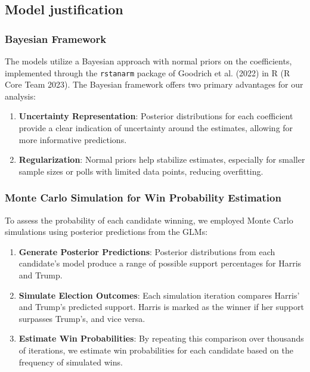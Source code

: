 \documentclass[
  letterpaper,
  DIV=11,
  numbers=noendperiod]{scrartcl}
\begin{document}
\subsection{Model justification}\label{model-justification}

\subsubsection{Bayesian Framework}\label{bayesian-framework}

The models utilize a Bayesian approach with normal priors on the
coefficients, implemented through the \texttt{rstanarm} package of
Goodrich et al. (2022) in R (R Core Team 2023). The Bayesian framework
offers two primary advantages for our analysis:

\begin{enumerate}
\def\labelenumi{\arabic{enumi}.}
\item
  \textbf{Uncertainty Representation}: Posterior distributions for each
  coefficient provide a clear indication of uncertainty around the
  estimates, allowing for more informative predictions.
\item
  \textbf{Regularization}: Normal priors help stabilize estimates,
  especially for smaller sample sizes or polls with limited data points,
  reducing overfitting.
\end{enumerate}

\subsubsection{Monte Carlo Simulation for Win Probability
Estimation}\label{monte-carlo-simulation-for-win-probability-estimation}

To assess the probability of each candidate winning, we employed Monte
Carlo simulations using posterior predictions from the GLMs:

\begin{enumerate}
\def\labelenumi{\arabic{enumi}.}
\item
  \textbf{Generate Posterior Predictions}: Posterior distributions from
  each candidate's model produce a range of possible support percentages
  for Harris and Trump.
\item
  \textbf{Simulate Election Outcomes}: Each simulation iteration
  compares Harris' and Trump's predicted support. Harris is marked as
  the winner if her support surpasses Trump's, and vice versa.
\item
  \textbf{Estimate Win Probabilities}: By repeating this comparison over
  thousands of iterations, we estimate win probabilities for each
  candidate based on the frequency of simulated wins.
\end{enumerate}
\end{document}
